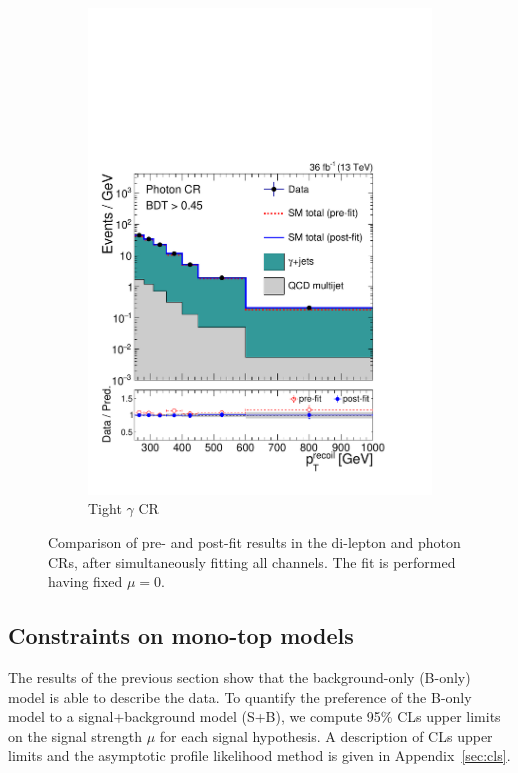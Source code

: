 \begin{figure}[]
\begin{center}
\begin{subfigure}[t]{0.24\textwidth}
            \includegraphics[width=\textwidth]{figures/monotop/postfit/stackedPostfit_photon_monotop.pdf}
            \caption{Tight $\gamma$ CR}
        \end{subfigure}
        \caption{Comparison of pre- and post-fit results in the di-lepton and photon CRs, after simultaneously fitting all channels.
        The fit is performed having fixed $\mu=0$.}
        \label{fig:mt:postfit_zgamma}
    \end{center}
\end{figure}


\subsection{Constraints on mono-top models}

The results of the previous section show that the background-only (B-only) model is able to describe the data.
To quantify the preference of the B-only model to a signal+background model (S+B), we compute 95\% CLs upper limits on the signal strength $\mu$ for each signal hypothesis.
A description of CLs upper limits and the asymptotic profile likelihood method is given in Appendix~\ref{sec:cls}.

